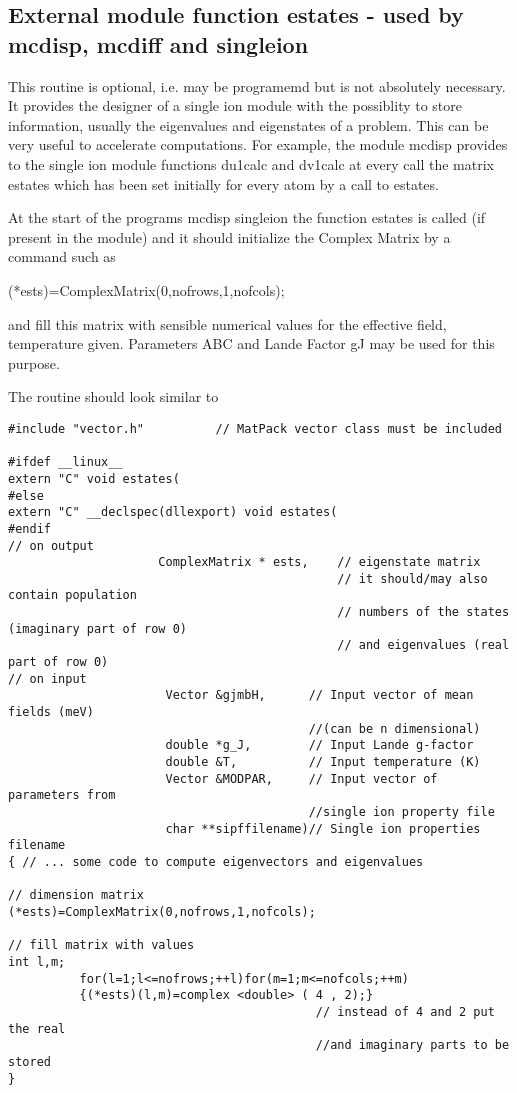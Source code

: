 \subsection{External module function {\prg estates} - used by {\prg mcdisp}, {\prg %
mcdiff} and {\prg singleion}}

This routine is optional, i.e. may be programemd but is not absolutely necessary. It provides the designer of a %
single ion module
with the possiblity to store information, usually the eigenvalues and eigenstates of a problem. This can be very %
useful to accelerate computations. 
For example, the module {\prg mcdisp} provides to the single ion module functions {\prg du1calc} and {\prg dv1calc}
at every call the matrix {\prg estates} which has been set initially for every atom
by a call to {\prg estates}.

At the start of the programs {\prg mcdisp} {\prg singleion} the function {\prg estates}
is called (if present in the module) and it should initialize the Complex Matrix by a command such as

{\prg (*ests)=ComplexMatrix(0,nofrows,1,nofcols);} 

and fill this matrix with sensible numerical values for the effective field, temperature given.
Parameters {\prg ABC} and Lande Factor {\prg gJ} may be used for this purpose. 

The routine should look similar to
{\footnotesize
\begin{verbatim}
#include "vector.h"          // MatPack vector class must be included

#ifdef __linux__
extern "C" void estates(
#else
extern "C" __declspec(dllexport) void estates(
#endif
// on output
                     ComplexMatrix * ests,    // eigenstate matrix      
                                              // it should/may also contain population 
                                              // numbers of the states (imaginary part of row 0)
                                              // and eigenvalues (real part of row 0)
// on input
                      Vector &gjmbH,      // Input vector of mean fields (meV) 
					                      //(can be n dimensional) 
                      double *g_J,        // Input Lande g-factor
                      double &T,          // Input temperature (K)
                      Vector &MODPAR,     // Input vector of parameters from 
					                      //single ion property file
                      char **sipffilename)// Single ion properties filename                      
{ // ... some code to compute eigenvectors and eigenvalues

// dimension matrix
(*ests)=ComplexMatrix(0,nofrows,1,nofcols);

// fill matrix with values
int l,m;
          for(l=1;l<=nofrows;++l)for(m=1;m<=nofcols;++m)
          {(*ests)(l,m)=complex <double> ( 4 , 2);}
                                           // instead of 4 and 2 put the real 
										   //and imaginary parts to be stored
}
\end{verbatim}
}


